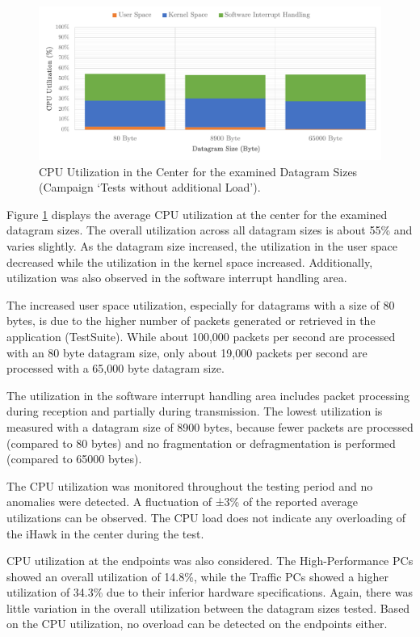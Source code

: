 \begin{figure}[h!]
    \centering
    \includegraphics[width=1\linewidth]{figures/reliability/ihawk/diagr2.pdf}
    \caption{\ac{CPU} Utilization in the Center for the examined Datagram Sizes (Campaign `Tests without additional Load').}
    \label{fig:diagr2CPU}
\end{figure}

Figure \ref{fig:diagr2CPU} displays the average \ac{CPU} utilization at the center for the examined datagram sizes. The overall utilization across all datagram sizes is about 55\% and varies slightly. As the datagram size increased, the utilization in the user space decreased while the utilization in the kernel space increased. Additionally, utilization was also observed in the software interrupt handling area.

The increased user space utilization, especially for datagrams with a size of 80 bytes, is due to the higher number of packets generated or retrieved in the application (TestSuite). While about 100,000 packets per second are processed with an 80 byte datagram size, only about 19,000 packets per second are processed with a 65,000 byte datagram size.

The utilization in the software interrupt handling area includes packet processing during reception and partially during transmission. The lowest utilization is measured with a datagram size of 8900 bytes, because fewer packets are processed (compared to 80 bytes) and no fragmentation or defragmentation is performed (compared to 65000 bytes).

The \ac{CPU} utilization was monitored throughout the testing period and no anomalies were detected. A fluctuation of ±3\% of the reported average utilizations can be observed. The \ac{CPU} load does not indicate any overloading of the iHawk in the center during the test.

\ac{CPU} utilization at the endpoints was also considered. The High-Performance PCs showed an overall utilization of 14.8\%, while the Traffic PCs showed a higher utilization of 34.3\% due to their inferior hardware specifications. Again, there was little variation in the overall utilization between the datagram sizes tested. Based on the \ac{CPU} utilization, no overload can be detected on the endpoints either.


